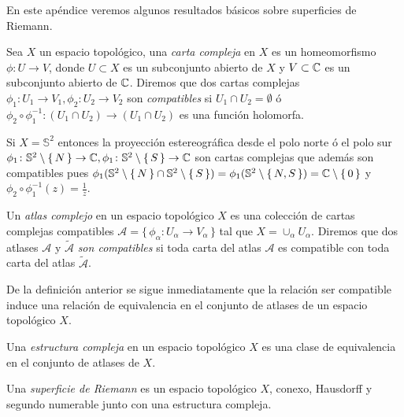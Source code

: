 En este apéndice veremos algunos resultados básicos sobre superficies de Riemann.

\begin{defn}
Sea $X$ un espacio topológico, una \emph{carta compleja} en $X$ es un homeomorfismo $\phi\colon U\rightarrow V$, donde $U\subset X$ es un subconjunto abierto de $X$ y $V\subset\mathbb{C}$ es un subconjunto abierto de $\mathbb{C}$. Diremos que dos cartas complejas $\phi_{1}\colon U_{1}\rightarrow V_{1},\phi_{2}\colon U_{2}\rightarrow V_{2}$ son \emph{compatibles} si $U_{1}\cap U_{2}=\emptyset$ ó $\phi_{2}\circ\phi^{-1}_{1}\colon (U_{1}\cap U_{2})\rightarrow (U_{1}\cap U_{2})$ es una función holomorfa.
\end{defn}

\begin{Ejemplo}
Si $X=\mathbb{S}^{2}$ entonces la proyección estereográfica desde el polo norte ó el polo sur $\phi_{1}\colon \mathbb{S}^{2}\setminus\{\, N\, \}\rightarrow \mathbb{C}, \phi_{1}\colon \mathbb{S}^{2}\setminus\{\, S\, \}\rightarrow \mathbb{C}$ son cartas complejas que además son compatibles pues $\phi_{1}(\mathbb{S}^{2}\setminus\{\, N\, \}\cap \mathbb{S}^{2}\setminus\{\, S\, \})=\phi_{1}(\mathbb{S}^{2}\setminus\{\, N,S\, \})=\mathbb{C}\setminus\{\, 0\, \}$ y $\phi_{2}\circ\phi^{-1}_{1}(z)=\tfrac{1}{z}$.
\end{Ejemplo}

\begin{defn}
Un \emph{atlas complejo} en un espacio topológico $X$ es una colección de cartas complejas compatibles $\mathcal{A}=\{\, \phi_{\alpha}\colon U_{\alpha}\rightarrow V_{\alpha}\, \}$ tal que $X=\cup_{\alpha}U_{\alpha}$. Diremos que dos atlases $\mathcal{A}$ y $\tilde{\mathcal{A}}$ \emph{son compatibles} si toda carta del atlas $\mathcal{A}$ es compatible con toda carta del atlas $\tilde{\mathcal{A}}$.
\end{defn}

De la definición anterior se sigue inmediatamente que la relación ser compatible induce una relación de equivalencia en el conjunto de atlases de un espacio topológico $X$.

\begin{defn}
Una \emph{estructura compleja} en un espacio topológico $X$ es una clase de equivalencia en el conjunto de atlases de $X$.
\end{defn}

\begin{defn}
Una \emph{superficie de Riemann} es un espacio topológico $X$, conexo, Hausdorff y segundo numerable junto con una estructura compleja. 
\end{defn}

